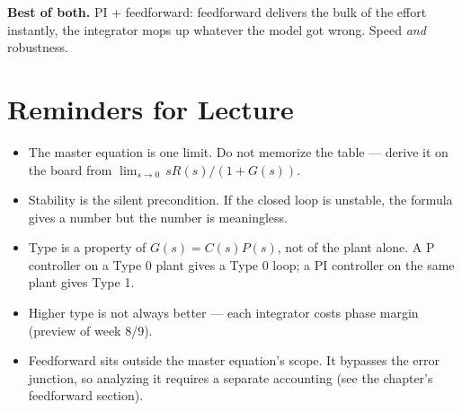 \documentclass[11pt]{article}
\begin{document}
\textbf{Best of both.}  PI + feedforward: feedforward delivers the bulk
of the effort instantly, the integrator mops up whatever the model got
wrong.  Speed \emph{and} robustness.

\section*{Reminders for Lecture}

\begin{itemize}
  \item The master equation is one limit.  Do not memorize the table ---
    derive it on the board from $\lim_{s\to 0}\, sR(s)/(1+G(s))$.
  \item Stability is the silent precondition.  If the closed loop is
    unstable, the formula gives a number but the number is meaningless.
  \item Type is a property of $G(s) = C(s)P(s)$, not of the plant alone.
    A P controller on a Type 0 plant gives a Type 0 loop; a PI controller
    on the same plant gives Type 1.
  \item Higher type is not always better --- each integrator costs phase
    margin (preview of week 8/9).
  \item Feedforward sits outside the master equation's scope.  It bypasses
    the error junction, so analyzing it requires a separate accounting
    (see the chapter's feedforward section).
\end{itemize}
\end{document}
